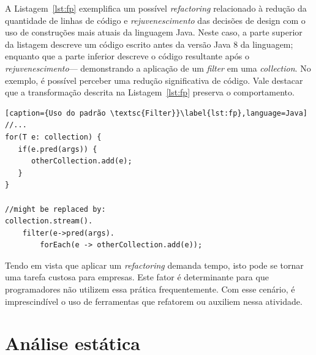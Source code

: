 
A Listagem~\ref{lst:fp} exemplifica um possível \emph{refactoring} relacionado \`{a} 
redução da quantidade de linhas de código e \emph{rejuvenescimento} 
das decisões de design com o uso de construções mais atuais da 
linguagem Java. Neste caso, a parte superior da listagem descreve um código 
escrito antes da versão Java 8 da linguagem; enquanto que a parte inferior descreve o 
código resultante após o \emph{rejuvenescimento}--- demonstrando a   
aplicação de um {\it filter} em uma {\it collection}. No exemplo, é  
possível perceber uma redução significativa de código. 
Vale destacar que a transformação descrita
na Listagem~\ref{lst:fp} preserva o comportamento.



\begin{lstlisting}[caption={Uso do padrão \textsc{Filter}}\label{lst:fp},language=Java] 
//...
for(T e: collection) {
   if(e.pred(args)) {
      otherCollection.add(e);
   }
}

//might be replaced by:
collection.stream().
	filter(e->pred(args).
		forEach(e -> otherCollection.add(e));
\end{lstlisting}




Tendo em vista que aplicar um \textit{refactoring} demanda tempo, 
isto pode se tornar uma tarefa custosa para empresas. Este fator é determinante 
para que programadores não utilizem essa prática frequentemente. Com esse 
cenário, é imprescindível o uso de ferramentas que refatorem ou auxiliem 
nessa atividade. 


\section{Análise estática}\label{sec:as}

